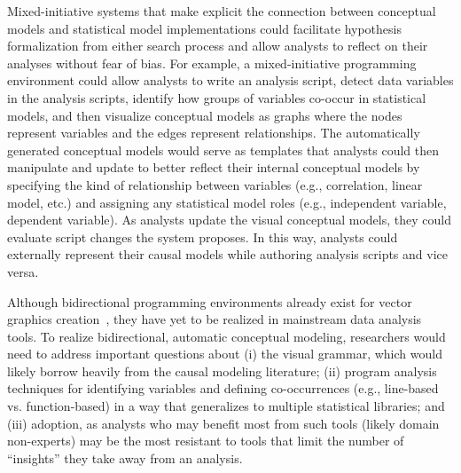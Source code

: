 
Mixed-initiative systems that make explicit the connection between conceptual
models and statistical model implementations could facilitate hypothesis
formalization from either search process and allow analysts to reflect on their
analyses without fear of bias. For example, a mixed-initiative programming
environment could allow analysts to write an analysis script, detect data
variables in the analysis scripts, identify how groups of variables co-occur in
statistical models, and then visualize conceptual models as graphs where the
nodes represent variables and the edges represent relationships. The
automatically generated conceptual models would serve as templates that analysts
could then manipulate and update to better reflect their internal conceptual
models by specifying the kind of relationship between variables (e.g.,
correlation, linear model, etc.) and assigning any statistical model roles
(e.g., independent variable, dependent variable). As analysts update the visual
conceptual models, they could evaluate script changes the system proposes.
In this way, analysts could externally represent their causal models while
authoring analysis scripts and vice versa. 

Although bidirectional programming environments already exist for vector graphics
creation~\cite{hempel2019sketch}, they have yet to be realized in mainstream data analysis
tools. To realize bidirectional, automatic conceptual modeling, researchers would
need to address important questions about (i) the visual grammar, which would
likely borrow heavily from the causal modeling literature; (ii) program analysis
techniques for identifying variables and defining co-occurrences (e.g., line-based
vs. function-based) in a way that generalizes to multiple statistical libraries;
and (iii) adoption, as analysts who may benefit most from such tools (likely
domain non-experts) may be the most resistant to tools that limit the number of
``insights'' they take away from an analysis. 



